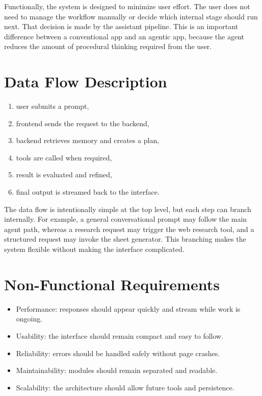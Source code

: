 \documentclass[11pt,oneside]{report}
\begin{document}
Functionally, the system is designed to minimize user effort. The user does not need to manage the workflow manually or decide which internal stage should run next. That decision is made by the assistant pipeline. This is an important difference between a conventional app and an agentic app, because the agent reduces the amount of procedural thinking required from the user.

\section{Data Flow Description}
\begin{enumerate}[leftmargin=1.2cm]
  \item user submits a prompt,
  \item frontend sends the request to the backend,
  \item backend retrieves memory and creates a plan,
  \item tools are called when required,
  \item result is evaluated and refined,
  \item final output is streamed back to the interface.
\end{enumerate}

The data flow is intentionally simple at the top level, but each step can branch internally. For example, a general conversational prompt may follow the main agent path, whereas a research request may trigger the web research tool, and a structured request may invoke the sheet generator. This branching makes the system flexible without making the interface complicated.

\section{Non-Functional Requirements}
\begin{itemize}[leftmargin=1.2cm]
  \item Performance: responses should appear quickly and stream while work is ongoing.
  \item Usability: the interface should remain compact and easy to follow.
  \item Reliability: errors should be handled safely without page crashes.
  \item Maintainability: modules should remain separated and readable.
  \item Scalability: the architecture should allow future tools and persistence.
\end{itemize}
\end{document}
